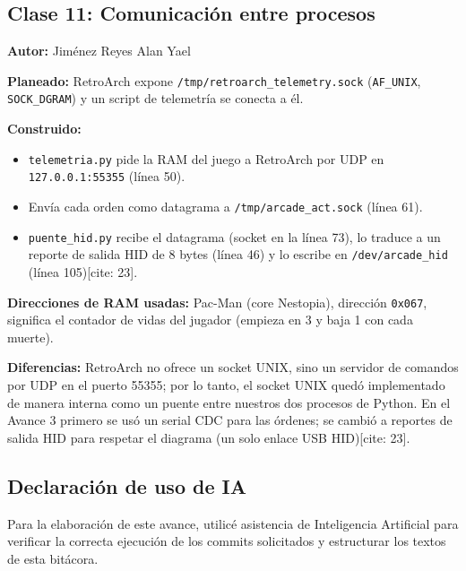 \subsection{Clase 11: Comunicación entre procesos}
\textbf{Autor:} Jiménez Reyes Alan Yael

\textbf{Planeado:} RetroArch expone \texttt{/tmp/retroarch\_telemetry.sock} (\texttt{AF\_UNIX}, \texttt{SOCK\_DGRAM}) y un script de telemetría se conecta a él.

\textbf{Construido:}
\begin{itemize}
    \item \texttt{telemetria.py} pide la RAM del juego a RetroArch por UDP en \texttt{127.0.0.1:55355} (línea 50).
    \item Envía cada orden como datagrama a \texttt{/tmp/arcade\_act.sock} (línea 61).
    \item \texttt{puente\_hid.py} recibe el datagrama (socket en la línea 73), lo traduce a un reporte de salida HID de 8 bytes (línea 46) y lo escribe en \texttt{/dev/arcade\_hid} (línea 105)[cite: 23].
\end{itemize}

\textbf{Direcciones de RAM usadas:} Pac-Man (core Nestopia), dirección \texttt{0x067}, significa el contador de vidas del jugador (empieza en 3 y baja 1 con cada muerte).

\textbf{Diferencias:} RetroArch no ofrece un socket UNIX, sino un servidor de comandos por UDP en el puerto 55355; por lo tanto, el socket UNIX quedó implementado de manera interna como un puente entre nuestros dos procesos de Python. En el Avance 3 primero se usó un serial CDC para las órdenes; se cambió a reportes de salida HID para respetar el diagrama (un solo enlace USB HID)[cite: 23].

\subsection{Declaración de uso de IA}
Para la elaboración de este avance, utilicé asistencia de Inteligencia Artificial para verificar la correcta ejecución de los commits solicitados y estructurar los textos de esta bitácora.
